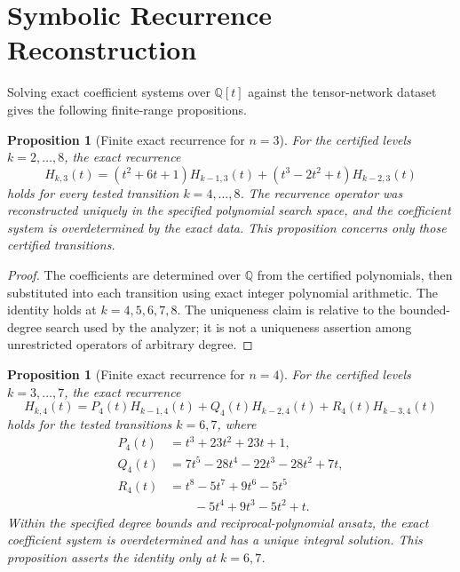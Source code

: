 \documentclass[11pt,a4paper]{article}
\newtheorem{proposition}[theorem]{Proposition}
\theoremstyle{definition}
\begin{document}
\section{Symbolic Recurrence Reconstruction}
\label{sec:recurrences}

Solving exact coefficient systems over $\mathbb{Q}[t]$ against the
tensor-network dataset gives the following finite-range propositions.

\begin{proposition}[Finite exact recurrence for $n=3$]
\label{prop:recurrence-n3}
For the certified levels $k=2,\ldots,8$, the exact recurrence
\begin{equation}\label{eq:recurrence-n3}
H_{k,3}(t)
=(t^2+6t+1)H_{k-1,3}(t)
+(t^3-2t^2+t)H_{k-2,3}(t)
\end{equation}
holds for every tested transition $k=4,\ldots,8$. The recurrence
operator was reconstructed uniquely in the specified polynomial search
space, and the coefficient system is overdetermined by the exact data.
This proposition concerns only those certified transitions.
\end{proposition}

\begin{proof}
The coefficients are determined over $\mathbb{Q}$ from the certified
polynomials, then substituted into each transition using exact integer
polynomial arithmetic. The identity holds at $k=4,5,6,7,8$. The
uniqueness claim is relative to the bounded-degree search used by the
analyzer; it is not a uniqueness assertion among unrestricted operators
of arbitrary degree.
\end{proof}

\begin{proposition}[Finite exact recurrence for $n=4$]
\label{prop:recurrence-n4}
For the certified levels $k=3,\ldots,7$, the exact recurrence
\begin{equation}\label{eq:recurrence-n4}
H_{k,4}(t)
=P_4(t)H_{k-1,4}(t)
+Q_4(t)H_{k-2,4}(t)
+R_4(t)H_{k-3,4}(t)
\end{equation}
holds for the tested transitions $k=6,7$, where
\begin{align*}
P_4(t)&=t^3+23t^2+23t+1,\\
Q_4(t)&=7t^5-28t^4-22t^3-28t^2+7t,\\
R_4(t)&=t^8-5t^7+9t^6-5t^5\\
&\qquad{}-5t^4+9t^3-5t^2+t.
\end{align*}
Within the specified degree bounds and reciprocal-polynomial ansatz,
the exact coefficient system is overdetermined and has a unique integral
solution. This proposition asserts the identity only at $k=6,7$.
\end{proposition}
\end{document}
